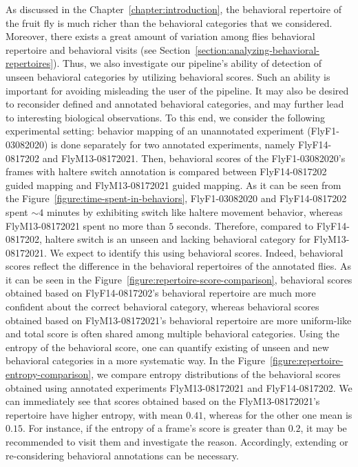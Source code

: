 As discussed in the Chapter~\ref{chapter:introduction}, the behavioral repertoire of the fruit fly is much richer than the behavioral categories that we considered.
Moreover, there exists a great amount of variation among flies behavioral repertoire and behavioral visits (see Section~\ref{section:analyzing-behavioral-repertoires}).
Thus, we also investigate our pipeline's ability of detection of unseen behavioral categories by utilizing behavioral scores.
Such an ability is important for avoiding misleading the user of the pipeline. It may also be desired to reconsider defined and annotated behavioral categories, and may further lead to interesting biological observations.
To this end, we consider the following experimental setting: behavior mapping of an unannotated experiment (FlyF1-03082020) is done separately for two annotated experiments, namely FlyF14-0817202 and FlyM13-08172021.
Then, behavioral scores of the FlyF1-03082020's frames with haltere switch annotation is compared between FlyF14-0817202 guided mapping and FlyM13-08172021 guided mapping.
As it can be seen from the Figure~\ref{figure:time-spent-in-behaviors}, FlyF1-03082020 and FlyF14-0817202 spent ${\sim}4$ minutes by exhibiting switch like haltere movement behavior, whereas FlyM13-08172021 spent no more than $5$ seconds.
Therefore, compared to FlyF14-0817202, haltere switch is an unseen and lacking behavioral category for FlyM13-08172021.
We expect to identify this using behavioral scores.
Indeed, behavioral scores reflect the difference in the behavioral repertoires of the annotated flies.
As it can be seen in the Figure~\ref{figure:repertoire-score-comparison}, behavioral scores obtained based on FlyF14-0817202's behavioral repertoire are much more confident about the correct behavioral category, whereas behavioral scores obtained based on FlyM13-08172021's behavioral repertoire are more uniform-like and total score is often shared among multiple behavioral categories.
Using the entropy of the behavioral score, one can quantify existing of unseen and new behavioral categories in a more systematic way.
In the Figure~\ref{figure:repertoire-entropy-comparison}, we compare entropy distributions of the behavioral scores obtained using annotated experiments FlyM13-08172021 and FlyF14-0817202.
We can immediately see that scores obtained based on the FlyM13-08172021's repertoire have higher entropy, with mean $0.41$, whereas for the other one mean is $0.15$.
For instance, if the entropy of a frame's score is greater than $0.2$, it may be recommended to visit them and investigate the reason.
Accordingly, extending or re-considering behavioral annotations can be necessary.

